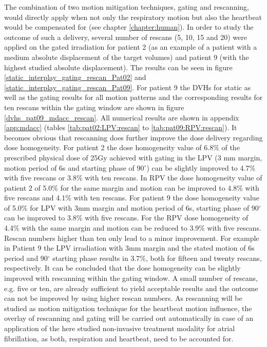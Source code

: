 The combination of two motion mitigation techniques, gating and rescanning, would directly apply when not only the respiratory motion but 
also the heartbeat would be compensated for (see chapter \ref{chapter:human}). In order to study the outcome of such a delivery, several 
number of rescans (5, 10, 15 and 20) were applied on the gated irradiation for patient 2 (as an example of a patient with a medium absolute 
displacement of the target volumes) and patient 9 (with the highest studied absolute displacement). The results can be seen in figure 
\ref{static_interplay_gating_rescan_Pat02} and \ref{static_interplay_gating_rescan_Pat09}. For patient 9 the DVHs for static as well as 
the gating results for all motion patterns and the corresponding results for ten rescans within the gating window are shown in 
figure \ref{dvhs_pat09_mdacc_rescan}. All numerical results are shown in appendix \ref{app:mdacc} (tables \ref{tab:pat02:LPV:rescan} to 
\ref{tab:pat09:RPV:rescan}).\newline
\newline
It becomes obvious that rescanning does further improve the dose delivery regarding dose homogeneity. For patient 2 the 
dose homogeneity value of 6.8\% of the prescribed physical dose of 25Gy achieved with gating in the LPV (3 mm margin, motion period of 6s and starting 
phase of 90$^{\circ}$) can be slightly improved to 4.7\% with five rescans or 3.8\% with ten rescans. In RPV the dose homogeneity value of 
patient 2 of 5.0\% for the same margin and motion can be improved to 4.8\% with five rescans and 4.1\% with ten rescans. 
For patient 9 the dose homogeneity value of 5.0\% for LPV with 3mm margin and motion period of 6s, starting phase of 90$^{\circ}$ can 
be improved to 3.8\% with five rescans. For the RPV dose homogeneity of 4.4\% with the same margin and motion can be reduced to 
3.9\% with five rescans. Rescan numbers higher than ten only lead to a minor improvement. For example in Patient 9 the LPV irradiation with 
3mm margin and the stated motion of 6s period and 90$^{\circ}$ starting phase results in 3.7\%, both for fifteen and twenty rescans, 
respectively.\newline
\newline
It can be concluded that the dose homogeneity can be slightly improved with rescanning within the gating window. A small number of rescans, 
e.g. five or ten, are already sufficient to yield acceptable results and the outcome can not be improved by using higher rescan numbers. 
As rescanning will be studied as motion mitigation technique for the heartbeat motion influence, the overlay of rescanning and gating will be 
carried out automatically in case of an application of the here studied non-invasive treatment modality for atrial fibrillation, as both, 
respiration and heartbeat, need to be accounted for. 

